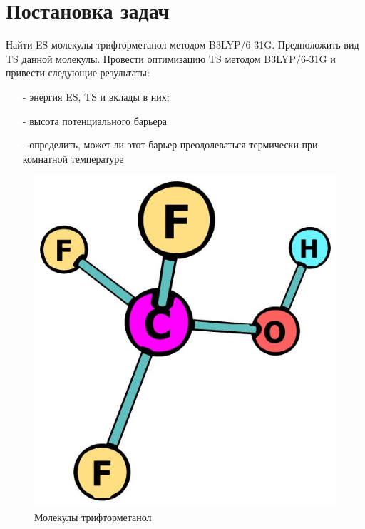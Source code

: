 \section{Постановка задач}
Найти ES молекулы трифторметанол методом B3LYP/6-31G. Предположить вид TS данной молекулы. Провести оптимизацию TS методом B3LYP/6-31G и привести следующие результаты:
\begin{itemize}
    \item[-] энергия ES, TS и вклады в них;
    \item[-] высота потенциального барьера
    \item[-] определить, может ли этот барьер преодолеваться термически при комнатной температуре
\end{itemize}

\begin{figure}[H]
\centering
\captionsetup{justification=centering}
\includegraphics[scale=0.4]{fig/0.jpg}
\caption{Молекулы трифторметанол}
\end{figure}
